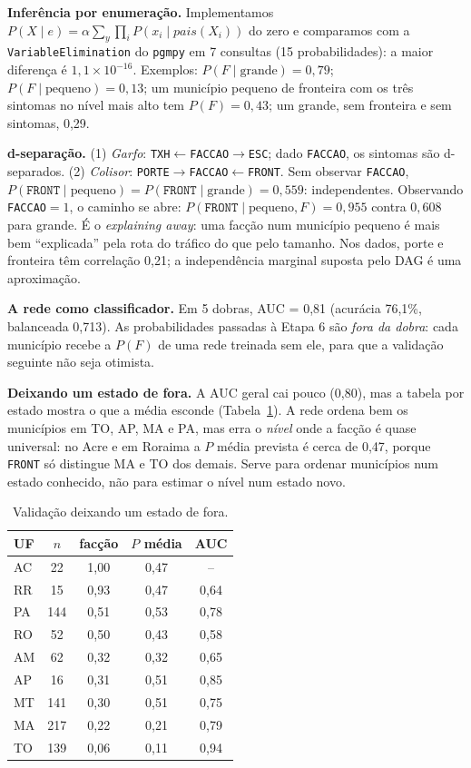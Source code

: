 \documentclass[10pt,a4paper,twocolumn]{article}
\begin{document}
\textbf{Inferência por enumeração.} Implementamos
$P(X\mid e)=\alpha\sum_y\prod_i P(x_i\mid\mathit{pais}(X_i))$ do zero e comparamos com a
\texttt{VariableElimination} do \texttt{pgmpy} em 7 consultas (15 probabilidades): a maior diferença é $1{,}1\times10^{-16}$.
Exemplos: $P(F\mid\text{grande})=0{,}79$; $P(F\mid\text{pequeno})=0{,}13$; um município pequeno de
fronteira com os três sintomas no nível mais alto tem $P(F)=0{,}43$; um grande, sem fronteira e sem
sintomas, 0,29.

\textbf{d-separação.} (1) \emph{Garfo}: \texttt{TXH}$\leftarrow$\texttt{FACCAO}$\rightarrow$\texttt{ESC};
dado \texttt{FACCAO}, os sintomas são d-separados. (2) \emph{Colisor}:
\texttt{PORTE}$\to$\texttt{FACCAO}$\leftarrow$\texttt{FRONT}. Sem observar \texttt{FACCAO},
$P(\texttt{FRONT}\mid\text{pequeno})=P(\texttt{FRONT}\mid\text{grande})=0{,}559$: independentes. Observando
\texttt{FACCAO}$=1$, o caminho se abre: $P(\texttt{FRONT}\mid\text{pequeno},F)=0{,}955$ contra $0{,}608$
para grande. É o \emph{explaining away}: uma facção num município pequeno é mais bem ``explicada''
pela rota do tráfico do que pelo tamanho. Nos dados, porte e fronteira têm correlação 0,21; a
independência marginal suposta pelo DAG é uma aproximação.

\textbf{A rede como classificador.} Em 5 dobras, AUC = 0,81 (acurácia 76,1\%, balanceada 0,713).
As probabilidades passadas à Etapa 6 são \emph{fora da dobra}: cada município recebe a $P(F)$ de uma
rede treinada sem ele, para que a validação seguinte não seja otimista.

\textbf{Deixando um estado de fora.} A AUC geral cai pouco (0,80), mas a tabela por estado mostra o
que a média esconde (Tabela~\ref{tab:uf}). A rede ordena bem os municípios em TO, AP, MA e PA, mas
erra o \emph{nível} onde a facção é quase universal: no Acre e em Roraima a $P$ média prevista é cerca
de 0,47, porque \texttt{FRONT} só distingue MA e TO dos demais. Serve para ordenar municípios num
estado conhecido, não para estimar o nível num estado novo.

\begin{table}[H]\centering\small
\begin{tabular}{lcccc}\toprule
UF & $n$ & facção & $P$ média & AUC\\\midrule
AC & 22 & 1,00 & 0,47 & --\\
RR & 15 & 0,93 & 0,47 & 0,64\\
PA & 144 & 0,51 & 0,53 & 0,78\\
RO & 52 & 0,50 & 0,43 & 0,58\\
AM & 62 & 0,32 & 0,32 & 0,65\\
AP & 16 & 0,31 & 0,51 & 0,85\\
MT & 141 & 0,30 & 0,51 & 0,75\\
MA & 217 & 0,22 & 0,21 & 0,79\\
TO & 139 & 0,06 & 0,11 & 0,94\\\bottomrule
\end{tabular}\caption{Validação deixando um estado de fora.}\label{tab:uf}\end{table}
\end{document}
